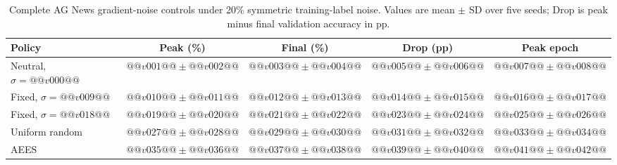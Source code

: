 \begin{table}[H]
\centering
\caption{Complete AG News gradient-noise controls under 20\% symmetric
training-label noise. Values are mean $\pm$ SD over five seeds; Drop is peak
minus final validation accuracy in pp.}
\label{tab:appendix-agnews-controls}
\scriptsize
\setlength{\tabcolsep}{3.2pt}
\renewcommand{\arraystretch}{1.03}
\begin{tabular}{lcccc}
\toprule
Policy & Peak (\%) & Final (\%) & Drop (pp) & Peak epoch \\
\midrule
Neutral, $\sigma=@@v000@@$ & $@@v001@@\pm@@v002@@$ & $@@v003@@\pm@@v004@@$ & $@@v005@@\pm@@v006@@$ & $@@v007@@\pm@@v008@@$ \\
Fixed, $\sigma=@@v009@@$ & $@@v010@@\pm@@v011@@$ & $@@v012@@\pm@@v013@@$ & $@@v014@@\pm@@v015@@$ & $@@v016@@\pm@@v017@@$ \\
Fixed, $\sigma=@@v018@@$ & $@@v019@@\pm@@v020@@$ & $@@v021@@\pm@@v022@@$ & $@@v023@@\pm@@v024@@$ & $@@v025@@\pm@@v026@@$ \\
Uniform random & $@@v027@@\pm@@v028@@$ & $@@v029@@\pm@@v030@@$ & $@@v031@@\pm@@v032@@$ & $@@v033@@\pm@@v034@@$ \\
AEES & $@@v035@@\pm@@v036@@$ & $@@v037@@\pm@@v038@@$ & $@@v039@@\pm@@v040@@$ & $@@v041@@\pm@@v042@@$ \\
\bottomrule
\end{tabular}
\end{table}
